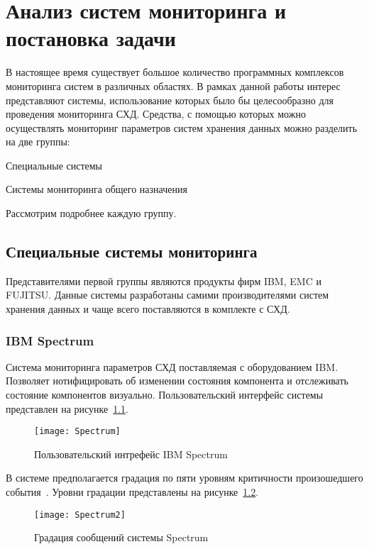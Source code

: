 \chapter{Анализ систем мониторинга и постановка задачи}
В настоящее время существует большое количество программных комплексов
мониторинга систем в различных областях. В рамках данной работы интерес представляют системы, использование которых было бы целесообразно для проведения мониторинга СХД.
Средства, с помощью которых можно осуществлять мониторинг параметров систем хранения данных можно разделить на две группы:
\begin{itemize*}
	\item{Специальные системы}
	\item{Системы мониторинга общего назначения}
\end{itemize*}
Рассмотрим подробнее каждую группу.
 
\section{Специальные системы мониторинга}
Представителями первой группы являются продукты фирм IBM, EMC и FUJITSU. Данные системы разработаны самими  производителями систем хранения данных и чаще всего поставляются в комплекте с СХД.

\subsection{IBM Spectrum}
Система мониторинга параметров СХД поставляемая с оборудованием IBM. Позволяет нотифицировать об изменении состояния компонента и отслеживать состояние компонентов визуально. Пользовательский интерфейс системы представлен на рисунке~\ref{fig:Spectrum}.
\begin{figure}[H]
	\centering
	\texttt{[image: Spectrum]}
	\caption{Пользовательский интрефейс IBM Spectrum}
	\label{fig:Spectrum}
\end{figure}

В системе предполагается градация по пяти уровням критичности произошедшего события~\cite{Spectrum}. Уровни градации представлены на рисунке~\ref{fig:Spectrum2}.
\begin{figure}[H]
	\centering
	\texttt{[image: Spectrum2]}
	\caption{Градация сообщений системы Spectrum}
	\label{fig:Spectrum2}
\end{figure}

